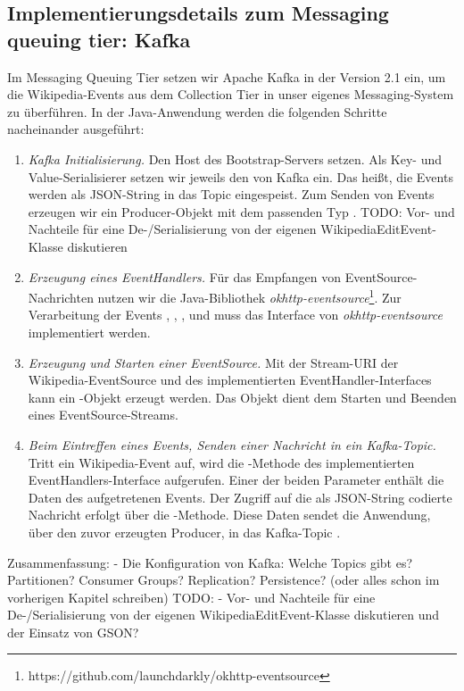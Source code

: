 \subsection{Implementierungsdetails zum Messaging queuing tier: Kafka}
Im Messaging Queuing Tier setzen wir Apache Kafka in der Version 2.1 ein, um die Wikipedia-Events aus dem Collection Tier
in unser eigenes Messaging-System zu überführen. In der Java-Anwendung werden die folgenden
Schritte nacheinander ausgeführt:
\begin{enumerate}
    \item \textit{Kafka Initialisierung.} Den Host des Bootstrap-Servers setzen. Als Key- und Value-Serialisierer setzen wir
    jeweils den  von Kafka ein. Das heißt, die Events werden als JSON-String in das Topic 
    eingespeist. Zum Senden von Events erzeugen wir ein Producer-Objekt mit dem passenden Typ .
    TODO: Vor- und Nachteile für eine De-/Serialisierung von der eigenen WikipediaEditEvent-Klasse diskutieren
    \item \textit{Erzeugung eines EventHandlers.} Für das Empfangen von EventSource-Nachrichten nutzen wir die Java-Bibliothek
    \textit{okhttp-eventsource}\footnote{https://github.com/launchdarkly/okhttp-eventsource}. Zur Verarbeitung der Events
    , , ,  und  muss das Interface  von
    \textit{okhttp-eventsource} implementiert werden.
    \item \textit{Erzeugung und Starten einer EventSource.} Mit der Stream-URI der Wikipedia-EventSource und des implementierten EventHandler-Interfaces
    kann ein -Objekt erzeugt werden. Das Objekt dient dem Starten und Beenden eines EventSource-Streams.
    \item \textit{Beim Eintreffen eines Events, Senden einer Nachricht in ein Kafka-Topic.} Tritt ein Wikipedia-Event auf,
    wird die -Methode des implementierten EventHandlers-Interface aufgerufen. Einer der beiden Parameter enthält die Daten
    des aufgetretenen Events. Der Zugriff auf die als JSON-String codierte Nachricht erfolgt über die -Methode.
    Diese Daten sendet die Anwendung, über den zuvor erzeugten Producer, in das Kafka-Topic .
\end{enumerate}

Zusammenfassung:
- Die Konfiguration von Kafka: Welche Topics gibt es? Partitionen? Consumer Groups? Replication? Persistence? (oder alles schon im vorherigen Kapitel schreiben)
TODO:
- Vor- und Nachteile für eine De-/Serialisierung von der eigenen WikipediaEditEvent-Klasse diskutieren und der Einsatz von GSON?

